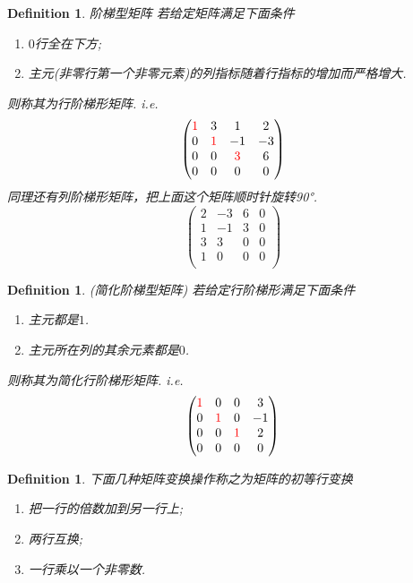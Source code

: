 \documentclass{article}
\newtheorem{definition}[theorem]{Definition}
\begin{document}
\begin{definition}
\rm {\color{red} 阶梯型矩阵} 若给定矩阵满足下面条件
\begin{enumerate}
	\item $0$行全在下方;
	\item {\color{red}主元}(非零行第一个非零元素)的列指标随着行指标的增加而严格增大.
\end{enumerate}
则称其为行阶梯形矩阵. i.e.
$$
\begin{pmatrix}
{\color{red}1} & 3 & 1 & 2 \\
0 & {\color{red}1} & -1 & -3 \\
0 & 0 & {\color{red}3} & 6 \\
0 & 0 & 0 & 0 \\
\end{pmatrix}
$$
同理还有列阶梯形矩阵，把上面这个矩阵顺时针旋转90°.
$$
\begin{pmatrix}
2 & -3 & 6 & 0 \\
1 & -1 & 3 & 0 \\
3 & 3 & 0 & 0  \\
1 & 0 & 0 & 0 \\
\end{pmatrix}
$$
\end{definition}

\begin{definition}
\rm {\color{red} (简化阶梯型矩阵)} 若给定行阶梯形满足下面条件
\begin{enumerate}
	\item 主元都是$1$.
	\item 主元所在列的其余元素都是$0$.
\end{enumerate}
则称其为简化行阶梯形矩阵. i.e.
$$
\begin{pmatrix}
{\color{red}1} & 0 & 0 & 3 \\
0 & {\color{red}1} & 0 & -1 \\
0 & 0 & {\color{red}1} & 2 \\
0 & 0 & 0 & 0 \\
\end{pmatrix}
$$
\end{definition}

\begin{definition}
\rm 下面几种矩阵变换操作称之为矩阵的{\color{red}初等行变换}
\begin{enumerate}
	\item 把一行的倍数加到另一行上;
	\item 两行互换;
	\item 一行乘以一个非零数.
\end{enumerate}
\end{definition}
\end{document}
